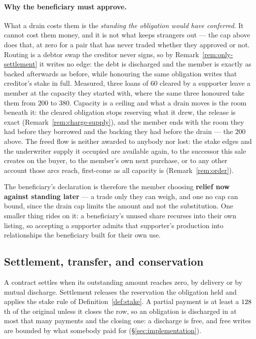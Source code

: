 \paragraph{Why the beneficiary must approve.} What a drain costs them is the
\emph{standing the obligation would have conferred}. It cannot cost them money, and it is
not what keeps strangers out --- the cap above does that, at zero for a pair that has never
traded whether they approved or not. Routing is a debtor swap the creditor never signs, so
by Remark~\ref{rem:only-settlement} it writes no edge: the debt is discharged and the
member is exactly as backed afterwards as before, while honouring the same obligation
writes that creditor's stake in full. Measured, three loans of $60$ cleared by a supporter
leave a member at the capacity they started with, where the same three honoured take them
from $200$ to $380$. Capacity is a ceiling and what a drain moves is the room beneath it:
the cleared obligation stops reserving what it drew, the release is exact
(Remark~\ref{rem:charge-supply}), and the member ends with the room they had before they
borrowed and the backing they had before the drain --- the $200$ above. The freed flow is
neither awarded to anybody nor lost: the stake edges and the underwriter supply it
occupied are available again, to the successor this sale creates on the buyer, to the
member's own next purchase, or to any other account those arcs reach, first-come as all
capacity is (Remark~\ref{rem:order}).

The beneficiary's declaration is therefore the member choosing \textbf{relief now against
standing later} --- a trade only they can weigh, and one no cap can bound, since the drain
cap limits the amount and not the substitution. One smaller thing rides on it: a
beneficiary's unused share recurses into their own listing, so accepting a supporter
admits that supporter's production into relationships the beneficiary built for their own
use.

\subsection{Settlement, transfer, and conservation}

A contract settles when its outstanding amount reaches zero, by delivery or by mutual
discharge. Settlement releases the reservation the obligation held and applies the stake
rule of Definition~\ref{def:stake}. A partial payment is at least a
$128$th of the original unless it closes the row, so an obligation is
discharged in at most that many payments and the closing one: a discharge is free, and
free writes are bounded by what somebody paid for (\S\ref{sec:implementation}).


